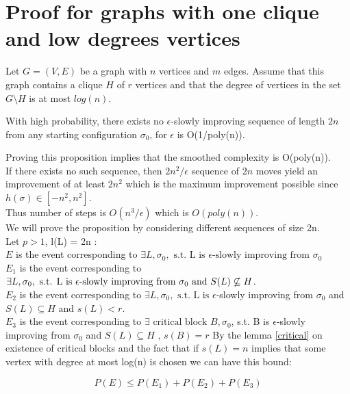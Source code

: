 \section{Proof for graphs with one clique and low degrees vertices}
Let $G = (V,E)$ be a graph with $n$ vertices and $m$ edges. Assume that this graph contains a clique $H$ of $r$ vertices and that the degree of vertices in the set $G \setminus H$ is at most $log(n)$. \\

\begin{proposition}
\label{prop}
With high probability, there exists no $\epsilon$-slowly improving sequence of length $2n$ from any starting configuration $\sigma_0$, for $\epsilon$ is O(1/poly(n)).
\end{proposition}

Proving this proposition implies that the smoothed complexity is O(poly(n)). \\
If there exists no such sequence, then $2n^2/\epsilon$ sequence of $2n$ moves yield an improvement of at least $2n^2$ which is the maximum improvement possible since $h(\sigma) \in [-n^2,n^2]$. \\
Thus number of steps is $O(n^3/\epsilon)$ which is $O(poly(n))$. \\

We will prove the proposition by considering different sequences of size 2n.\\
Let $ p > 1$, l(L) = 2n : \\
$E$ is the event corresponding to $\exists L, \sigma_0, \text{ s.t. L is }\epsilon\text{-slowly improving from }\sigma_0 $\\
$E_1$ is the event corresponding to $\exists L, \sigma_0, \text{ s.t. L is }\epsilon\text{-slowly improving from }\sigma_0 \\
\text{ and }S(L) \not\subseteq H$.\\
$E_2$ is the event corresponding to $\exists L, \sigma_0,\text{ s.t. L is }\epsilon$-slowly  improving from $\sigma_0$ and $S(L) \subseteq H\text{ and }s(L) < r$. \\
$E_3$   is the event corresponding to $\exists \text{ critical block } B, \sigma_0$, s.t. B is $\epsilon$-slowly improving from $\sigma_0$ and $S(L) \subseteq H \text{ , } s(B) = r $
By the lemma \ref{critical} on existence of critical blocks and the fact that if $s(L) = n$ implies that some vertex with degree at most log(n) is chosen we can have this bound:

\begin{equation*}
P(E) \leq P(E_1) + P(E_2) + P(E_3)
\end{equation*}

